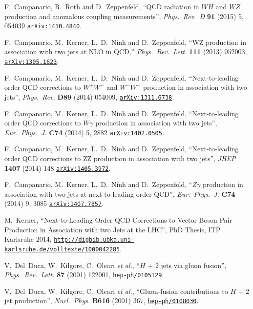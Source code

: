 \documentclass[english,12pt]{article}
\begin{document}
\begin{thebibliography}{10}
  F.~Campanario, R.~Roth and D.~Zeppenfeld,
  ``QCD radiation in $WH$ and $WZ$ production and anomalous coupling measurements'',
  {\em Phys.\ Rev.\ D} {\bf 91} (2015) 5,  054039
  \href{http://www.arXiv.org/abs/1410.4840}{{\tt arXiv:1410.4840}}.

  F.~Campanario, M.~Kerner, L.~D.~Ninh and D.~Zeppenfeld,
  ``WZ production in association with two jets at NLO in QCD,''
  {\em Phys.\ Rev.\ Lett.} {\bf 111} (2013) 052003,
  \href{http://arXiv.org/abs/1305.1623} {{\tt arXiv:1305.1623}}.

  F.~Campanario, M.~Kerner, L.~D.~Ninh and D.~Zeppenfeld,
  ``Next-to-leading order QCD corrections to $W^+W^+$ and $W^-W^-$ production in association with two jets'',
  {\em Phys.\ Rev.} {\bf D89} (2014) 054009,
  \href{http://arXiv.org/abs/1311.6738} {{\tt arXiv:1311.6738}}.

  F.~Campanario, M.~Kerner, L.~D.~Ninh and D.~Zeppenfeld,
  ``Next-to-leading order QCD corrections to $W \gamma$ production in association with two jets'',
  {\em Eur.\ Phys.\ J.} {\bf C74} (2014) 5, 2882 
  \href{http://arXiv.org/abs/1402.0505} {{\tt arXiv:1402.0505}}.

  F.~Campanario, M.~Kerner, L.~D.~Ninh and D.~Zeppenfeld,
  ``Next-to-leading order QCD corrections to ZZ production in association with two jets'',
  {\em JHEP} {\bf 1407} (2014) 148 
  \href{http://arXiv.org/abs/1405.3972} {{\tt arXiv:1405.3972}}.

  F.~Campanario, M.~Kerner, L.~D.~Ninh and D.~Zeppenfeld,
  ``$Z\gamma$ production in association with two jets at next-to-leading order QCD'',
  {\em Eur.\ Phys.\ J.} {\bf C74} (2014) 9, 3085 
  \href{http://arXiv.org/abs/1407.7857} {{\tt arXiv:1407.7857}}.

  M.~Kerner,
  ``Next-to-Leading Order QCD Corrections to Vector Boson Pair Production in Association with two Jets at the LHC'',
  {PhD Thesis, ITP Karlsruhe 2014}, 
\href{http://digbib.ubka.uni-karlsruhe.de/volltexte/1000042285}{{\tt http://digbib.ubka.uni-karlsruhe.de/volltexte/1000042285}}.

V.~Del~Duca, W.~Kilgore, C.~Oleari {\it et al.}, ``{$H$ + 2
  jets via gluon fusion}'', {\em Phys.\ Rev.\ Lett.} {\bf 87} (2001) 122001,
\href{http://www.arXiv.org/abs/hep-ph/0105129}{{\tt hep-ph/0105129}}.

V.~Del~Duca, W.~Kilgore, C.~Oleari {\it et al.},
  ``{Gluon-fusion contributions to $H$ + 2 jet production}'', {\em Nucl.\ Phys.}
  {\bf B616} (2001) 367,
\href{http://www.arXiv.org/abs/hep-ph/0108030}{{\tt hep-ph/0108030}}.


\end{thebibliography}
\end{document}
